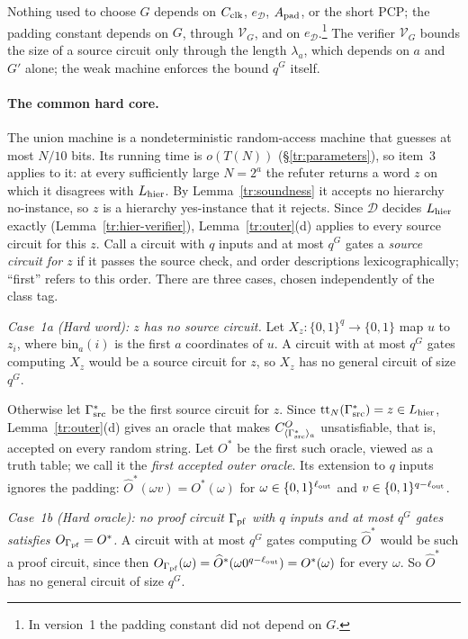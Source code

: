 \documentclass[11pt,letterpaper]{article}
\theoremstyle{definition}
\theoremstyle{remark}
\begin{document}
Nothing used to choose $G$ depends on $C_{\rm clk}$, $e_{\mathcal D}$,
$A_{\rm pad}$, or the short PCP; the padding constant depends on $G$,
through $\mathcal V_G$, and on $e_{\mathcal D}$.\footnote{In version~1
the padding constant did not depend on $G$.} The
verifier $\mathcal V_G$ bounds the size of a source circuit only through
the length $\lambda_a$, which depends on $a$ and $G'$ alone; the weak
machine enforces the bound $q^G$ itself.

\paragraph{The common hard core.}
The union machine is a nondeterministic random-access machine that
guesses at most $N/10$ bits. Its running time is $o(T(N))$
(\S\ref{tr:parameters}), so item~3 applies to it: at every sufficiently
large $N=2^a$ the refuter returns a word $z$ on which it disagrees with
$L_{\rm hier}$. By Lemma~\ref{tr:soundness} it accepts no hierarchy
no-instance, so $z$ is a hierarchy yes-instance that it rejects. Since
$\mathcal D$ decides $L_{\rm hier}$ exactly
(Lemma~\ref{tr:hier-verifier}), Lemma~\ref{tr:outer}(d)
applies to every source circuit for this $z$.
Call a circuit with $q$ inputs and at most $q^G$ gates a \emph{source
circuit for $z$} if it passes the source check, and order descriptions
lexicographically; ``first'' refers to this order.
There are three cases, chosen independently of the class tag.

\emph{Case~1a (Hard word): $z$ has no source circuit.} Let
$X_z:\{0,1\}^q\to\{0,1\}$ map $u$ to $z_i$, where $\mathrm{bin}_a(i)$ is
the first $a$ coordinates of $u$. A circuit with at most $q^G$ gates
computing $X_z$ would be a source circuit for $z$, so $X_z$ has no
general circuit of size $q^G$.

Otherwise let $\Gamma^*_{\rm src}$ be the first source circuit for $z$.
Since $\mathrm{tt}_N(\Gamma^*_{\rm src})=z\in L_{\rm hier}$,
Lemma~\ref{tr:outer}(d) gives an oracle that makes
$C^O_{\langle\Gamma^*_{\rm src}\rangle_a}$ unsatisfiable, that is,
accepted on every random string. Let $O^*$ be the first such oracle,
viewed as a truth table; we call it the \emph{first accepted outer
oracle}. Its extension to $q$ inputs ignores the padding:
$\widehat O^*(\omega v)=O^*(\omega)$ for
$\omega\in\{0,1\}^{\ell_{\rm out}}$ and
$v\in\{0,1\}^{q-\ell_{\rm out}}$.

\emph{Case~1b (Hard oracle): no proof circuit $\Gamma_{\rm pf}$ with $q$
inputs and at most $q^G$ gates satisfies $O_{\Gamma_{\rm pf}}=O^*$.} A
circuit with at most $q^G$ gates computing $\widehat O^*$ would be such a
proof circuit, since then
$O_{\Gamma_{\rm pf}}(\omega)=\widehat O^*(\omega0^{q-\ell_{\rm out}})=O^*(\omega)$
for every $\omega$. So $\widehat O^*$ has no general circuit of size
$q^G$.
\end{document}
